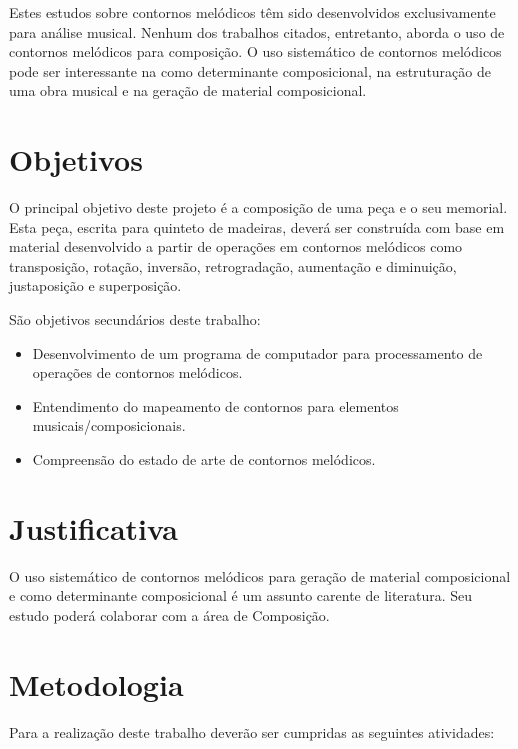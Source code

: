 \documentclass{article}
\begin{document}
Estes estudos sobre contornos melódicos têm sido desenvolvidos
exclusivamente para análise musical. Nenhum dos trabalhos citados,
entretanto, aborda o uso de contornos melódicos para composição. O uso
sistemático de contornos melódicos pode ser interessante na como
determinante composicional, na estruturação de uma obra musical e na
geração de material composicional.

\section{Objetivos}
\label{sec:objetivos}

O principal objetivo deste projeto é  a composição de uma peça e o seu
memorial.  Esta peça, escrita  para quinteto  de madeiras,  deverá ser
construída com base em material  desenvolvido a partir de operações em
contornos    melódicos   como    transposição,    rotação,   inversão,
retrogradação, aumentação e diminuição, justaposição e superposição.

São objetivos secundários deste trabalho:


\begin{itemize}
\item Desenvolvimento de um programa de computador para processamento
  de operações de contornos melódicos.
\item Entendimento do mapeamento de contornos para elementos
  musicais/composicionais.
\item Compreensão do estado de arte de contornos melódicos.
\end{itemize}

\section{Justificativa}
\label{sec:justificativa}

O uso sistemático de contornos melódicos para geração de material
composicional e como determinante composicional é um assunto carente
de literatura. Seu estudo poderá colaborar com a área de Composição.

\section{Metodologia}
\label{sec:metodologia}

Para a realização deste trabalho deverão ser cumpridas as seguintes
atividades:
\end{document}
